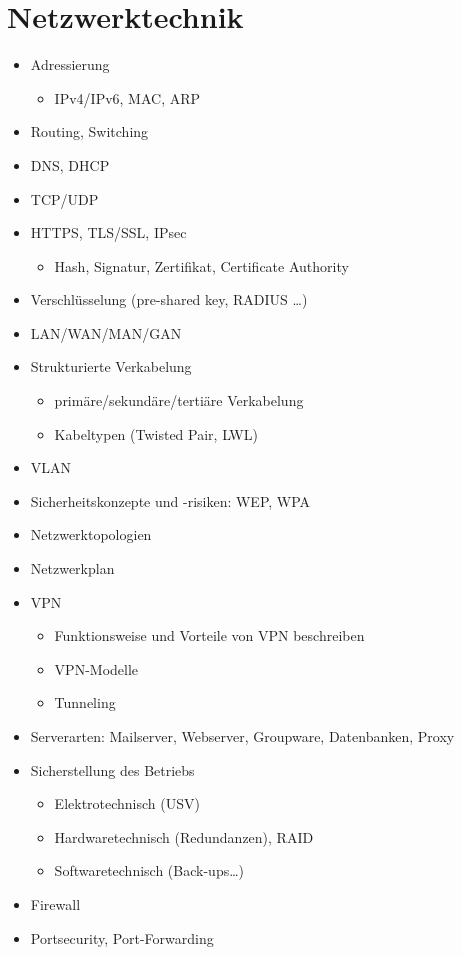 \section{Netzwerktechnik}
\label{sec:Netzwerktechnik}


\begin{itemize}
	\item Adressierung
	\begin{itemize}
		\item IPv4/IPv6, MAC, ARP
	\end{itemize}
	\item Routing, Switching
	\item DNS, DHCP
	\item TCP/UDP
	\item HTTPS, TLS/SSL, IPsec
	\begin{itemize}
		\item Hash, Signatur, Zertifikat, Certificate Authority
	\end{itemize}
	\item Verschlüsselung (pre-shared key, RADIUS …)
	\item LAN/WAN/MAN/GAN
	\item Strukturierte Verkabelung
	\begin{itemize}
		\item primäre/sekundäre/tertiäre Verkabelung
		\item Kabeltypen (Twisted Pair, LWL)
	\end{itemize}
	\item VLAN
	\item Sicherheitskonzepte und -risiken: WEP, WPA
	\item Netzwerktopologien
	\item Netzwerkplan
	\item VPN
	\begin{itemize}
		\item Funktionsweise und Vorteile von VPN beschreiben
		\item VPN-Modelle
		\item Tunneling
	\end{itemize}
	\item Serverarten: Mailserver, Webserver, Groupware, Datenbanken, Proxy
	\item Sicherstellung des Betriebs
	\begin{itemize}
		\item Elektrotechnisch (USV)
		\item Hardwaretechnisch (Redundanzen), RAID
		\item Softwaretechnisch (Back-ups…)
	\end{itemize}
	\item Firewall
	\item Portsecurity, Port-Forwarding
\end{itemize}

